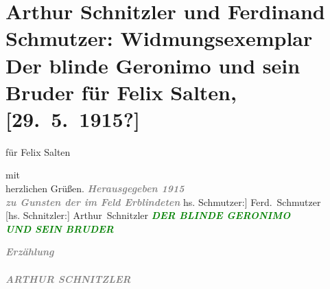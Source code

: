 

\renewcommand{\erwaehntePersonen}{Personen: Felix Salten, Ferdinand Schmutzer}
\renewcommand{\erwaehnteInstitutionen}{Institutionen: S. Fischer Verlag}
\renewcommand{\erwaehnteOrte}{Orte: Berlin, Wien}
\renewcommand{\erwaehnteWerke}{Werke: Der blinde Geronimo und sein Bruder}
\section[Arthur Schnitzler und Ferdinand Schmutzer: Widmungsexemplar Der blinde Geronimo und sein Bruder für Felix Salten, {[}29. 5. 1915?{]}]{Arthur Schnitzler und Ferdinand Schmutzer: Widmungsexemplar Der blinde
               Geronimo und sein Bruder für Felix Salten, {[}29. 5. 1915?{]}}
\nopagebreak{}
\rehead{ }\normalsize\beginnumbering{}
\toendnotes[C]{\smallbreak\pagebreak[2]}
\toendnotes[C]{\smallbreak}
\pstart
           \noindent{}\centering{}{\pb}für Felix Salten\pend
           
\pstart
           \noindent{}\centering{}mit {\\}herzlichen Grüßen.\pend
           {\bigskip}
\pstart
           \noindent{}\centering{}\textcolor{gray}{\textbf{\emph{Herausgegeben 1915}}}{\\}\textcolor{gray}{\textbf{\emph{zu Gunsten der im Feld Erblindeten}}}\pend
           {\bigskip}
\pstart
           \noindent{}\centering{}{[}hs. Schmutzer:{]} \spacefill\mbox{Ferd. Schmutzer}{\\}{[}hs. Schnitzler:{]} \spacefill\mbox{Arthur Schnitzler}\pend
           {\bigskip}
\pstart
           \noindent{}\centering{}{\pb}\textcolor{gray}{\textbf{\emph{\textcolor{green}{DER BLINDE GERONIMO {\\}UND SEIN
                           BRUDER}{}\ledrightnote{\textcolor{green}{Der blinde Geronimo und sein Bruder}}}}}\pend
           
\pstart
           \noindent{}\centering{}\textcolor{gray}{\textbf{\emph{Erzählung}}}{\\}\textcolor{gray}{\textbf{}}{\\}\textcolor{gray}{\textbf{\emph{ARTHUR SCHNITZLER}}}\pend
           
